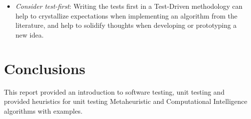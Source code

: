 \documentclass[a4paper, 11pt]{article}
\begin{document}
\begin{itemize}
	\item \emph{Consider test-first}: Writing the tests first in a Test-Driven methodology can help to crystallize expectations when implementing an algorithm from the literature, and help to solidify thoughts when developing or prototyping a new idea.
\end{itemize}

\section{Conclusions}
\label{sec:conclusions}
This report provided an introduction to software testing, unit testing and provided heuristics for unit testing Metaheuristic and Computational Intelligence algorithms with examples.




\end{document}
